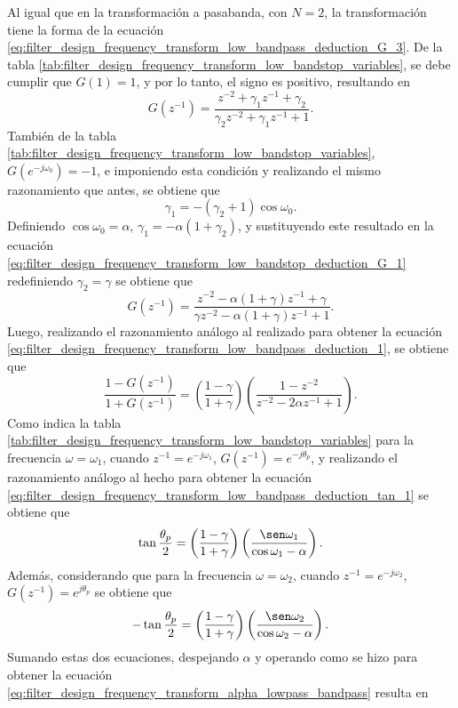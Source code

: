 \documentclass[a4paper]{report}
\begin{document}
Al igual que en la transformación a pasabanda, con \(N=2\), la transformación tiene la forma de la ecuación \ref{eq:filter_design_frequency_transform_low_bandpass_deduction_G_3}. De la tabla \ref{tab:filter_design_frequency_transform_low_bandstop_variables}, se debe cumplir que \(G(1)=1\), y por lo tanto, el signo es positivo, resultando en
\begin{equation}\label{eq:filter_design_frequency_transform_low_bandstop_deduction_G_1}
 G(z^{-1})=\frac{z^{-2}+\gamma_1z^{-1}+\gamma_2}{\gamma_2z^{-2}+\gamma_1z^{-1}+1}. 
\end{equation}
También de la tabla \ref{tab:filter_design_frequency_transform_low_bandstop_variables}, \(G(e^{-j\omega_0})=-1\), e imponiendo esta condición y realizando el mismo razonamiento que antes, se obtiene que 
\[
 \gamma_1=-(\gamma_2+1)\cos\omega_0.
\]
Definiendo \(\cos\omega_0=\alpha\), \(\gamma_1=-\alpha(1+\gamma_2)\), y sustituyendo este resultado en la ecuación \ref{eq:filter_design_frequency_transform_low_bandstop_deduction_G_1} redefiniendo \(\gamma_2=\gamma\) se obtiene que
\begin{equation}\label{eq:filter_design_frequency_transform_low_bandstop_deduction_G_2}
 G(z^{-1})=\frac{z^{-2}-\alpha(1+\gamma)z^{-1}+\gamma}{\gamma z^{-2}-\alpha(1+\gamma)z^{-1}+1}. 
\end{equation}
Luego, realizando el razonamiento análogo al realizado para obtener la ecuación \ref{eq:filter_design_frequency_transform_low_bandpass_deduction_1}, se obtiene que
\[
 \frac{1-G(z^{-1})}{1+G(z^{-1})}=\left(\frac{1-\gamma}{1+\gamma}\right)\left(\frac{1-z^{-2}}{z^{-2}-2\alpha z^{-1}+1}\right). 
\]
Como indica la tabla \ref{tab:filter_design_frequency_transform_low_bandstop_variables} para la frecuencia \(\omega=\omega_1\), cuando \(z^{-1}=e^{-j\omega_1}\), \(G(z^{-1})=e^{-j\theta_p}\), y realizando el razonamiento análogo al hecho para obtener la ecuación \ref{eq:filter_design_frequency_transform_low_bandpass_deduction_tan_1} se obtiene que
\begin{equation}\label{eq:filter_design_frequency_transform_low_bandstop_deduction_tan_1}
 \tan\frac{\theta_p}{2}=\left(\frac{1-\gamma}{1+\gamma}\right)\left(\frac{\sen\omega_1}{\cos\omega_1-\alpha}\right). 
\end{equation}
Además, considerando que para la frecuencia \(\omega=\omega_2\), cuando \(z^{-1}=e^{-j\omega_2}\), \(G(z^{-1})=e^{j\theta_p}\) se obtiene que
\[
 -\tan\frac{\theta_p}{2}=\left(\frac{1-\gamma}{1+\gamma}\right)\left(\frac{\sen\omega_2}{\cos\omega_2-\alpha}\right). 
\]
Sumando estas dos ecuaciones, despejando \(\alpha\) y operando como se hizo para obtener la ecuación \ref{eq:filter_design_frequency_transform_alpha_lowpass_bandpass} resulta en 
\end{document}
